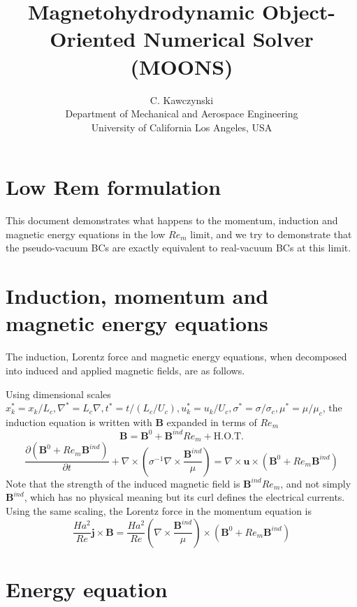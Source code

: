 \documentclass[11pt]{article}
\newcommand{\B}{\mathbf{B}}
\newcommand{\PD}{\partial}
\newcommand{\J}{\mathbf{j}}
\renewcommand{\U}{\mathbf{u}}
\newcommand{\SII}{\sigma^{-1}}
\begin{document}
\doublespacing
\title{Magnetohydrodynamic Object-Oriented Numerical Solver (MOONS)}
\author{C. Kawczynski \\
Department of Mechanical and Aerospace Engineering \\
University of California Los Angeles, USA\\
}
\maketitle

\section{Low Rem formulation}
This document demonstrates what happens to the momentum, induction and magnetic energy equations in the low $Re_m$ limit, and we try to demonstrate that the pseudo-vacuum BCs are exactly equivalent to real-vacuum BCs at this limit.

\section{Induction, momentum and magnetic energy equations}
The induction, Lorentz force and magnetic energy equations, when decomposed into induced and applied magnetic fields, are as follows.

Using dimensional scales $x_k^* = x_k/L_c, \nabla^* = L_c \nabla,t^* = t/(L_c/U_c),u_k^* = u_k/U_c,\sigma^* = \sigma/\sigma_c,\mu^* = \mu/\mu_c$, the induction equation is written with $\B$ expanded in terms of $Re_m$
\begin{equation}
	\B = \B^0 + \B^{ind} Re_m + \text{H.O.T.}
\end{equation}
\begin{equation}
  \frac{\PD (\B^0 + Re_m \B^{ind})}{\PD t} +
  \nabla \times \left( \SII \nabla \times \frac{\B^{ind}}{\mu} \right)
  = \nabla \times \U \times \left( \B^0 + Re_m \B^{ind} \right)
\end{equation}
Note that the strength of the induced magnetic field is $\B^{ind} Re_m$, and not simply $\B^{ind}$, which has no physical meaning but its curl defines the electrical currents. Using the same scaling, the Lorentz force in the momentum equation is
\begin{equation}
	 \frac{Ha^2}{Re} \J \times \B =
	 \frac{Ha^2}{Re} \left( \nabla \times \frac{\B^{ind}}{\mu} \right) \times {\left( \B^0 + Re_m \B^{ind} \right)}
\end{equation}
\section{Energy equation}
\end{document}
